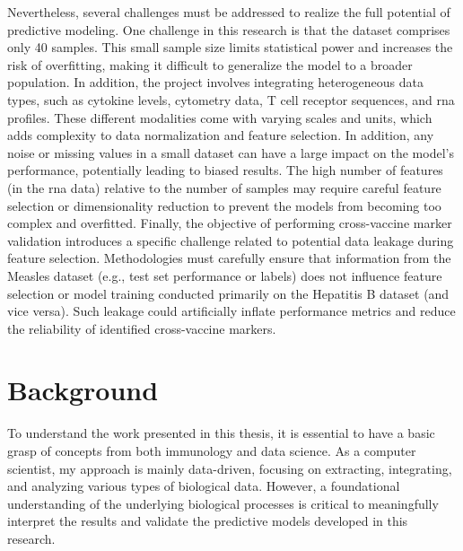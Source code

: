 \documentclass[12pt,a4paper]{report}
\begin{document}
Nevertheless, several challenges must be addressed to realize the full potential of predictive modeling. One challenge in this research is that the dataset comprises only 40 samples. This small sample size limits statistical power and increases the risk of overfitting, making it difficult to generalize the model to a broader population. In addition, the project involves integrating heterogeneous data types, such as cytokine levels, cytometry data, T cell receptor sequences, and \acrshort{rna} profiles. These different modalities come with varying scales and units, which adds complexity to data normalization and feature selection. In addition, any noise or missing values in a small dataset can have a large impact on the model’s performance, potentially leading to biased results. The high number of features (in the \acrshort{rna} data) relative to the number of samples may require careful feature selection or dimensionality reduction to prevent the models from becoming too complex and overfitted. Finally, the objective of performing cross-vaccine marker validation introduces a specific challenge related to potential data leakage during feature selection. Methodologies must carefully ensure that information from the Measles dataset (e.g., test set performance or labels) does not influence feature selection or model training conducted primarily on the Hepatitis B dataset (and vice versa). Such leakage could artificially inflate performance metrics and reduce the reliability of identified cross-vaccine markers.





\chapter{Background}
\noindent
To understand the work presented in this thesis, it is essential to have a basic grasp of concepts from both immunology and data science. As a computer scientist, my approach is mainly data-driven, focusing on extracting, integrating, and analyzing various types of biological data. However, a foundational understanding of the underlying biological processes is critical to meaningfully interpret the results and validate the predictive models developed in this research.
\end{document}
